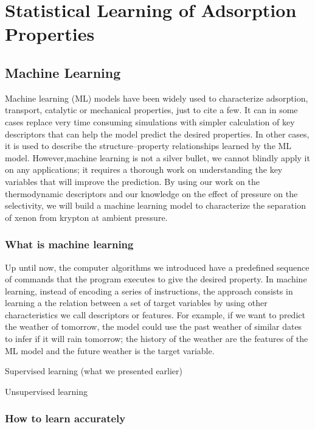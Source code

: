 \documentclass[main]{subfiles}
\begin{document}
\chapter{Statistical Learning of Adsorption Properties}
\vspace*{-1\baselineskip}

\section{Machine Learning}

Machine learning (ML) models have been widely used to characterize adsorption, transport, catalytic or mechanical properties, just to cite a few. It can in some cases replace very time consuming simulations with simpler calculation of key descriptors that can help the model predict the desired properties. In other cases, it is used to describe the structure--property relationships learned by the ML model. However,machine learning is not a silver bullet, we cannot blindly apply it on any applications; it requires a thorough work on understanding the key variables that will improve the prediction. By using our work on the thermodynamic descriptors and our knowledge on the effect of pressure on the selectivity, we will build a machine learning model to characterize the separation of xenon from krypton at ambient pressure.

\subsection{What is machine learning}

Up until now, the computer algorithms we introduced have a predefined sequence of commands that the program executes to give the desired property. In machine learning, instead of encoding a series of instructions, the approach consists in learning a the relation between a set of target variables by using other characteristics we call descriptors or features. For example, if we want to predict the weather of tomorrow, the model could use the past weather of similar dates to infer if it will rain tomorrow; the history of the weather are the features of the ML model and the future weather is the target variable.

Supervised learning (what we presented earlier)

Unsupervised learning

\subsection{How to learn accurately}
\end{document}
